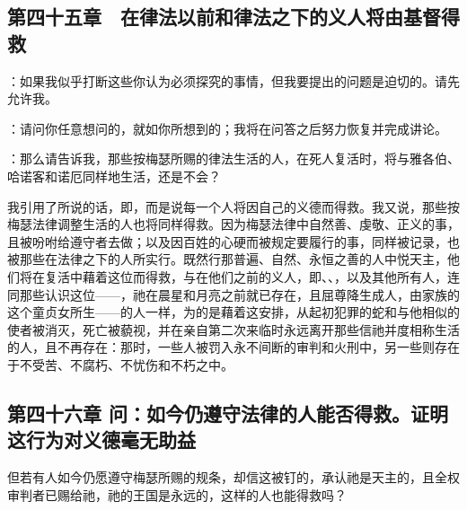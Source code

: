 
\subsection{第四十五章　在律法以前和律法之下的义人将由基督得救}

：如果我似乎打断这些你认为必须探究的事情，但我要提出的问题是迫切的。请先允许我。\par

：请问你任意想问的，就如你所想到的；我将在问答之后努力恢复并完成讲论。\par

：那么请告诉我，那些按梅瑟所赐的律法生活的人，在死人复活时，将与雅各伯、哈诺客和诺厄同样地生活，还是不会？\par

我引用了所说的话，即，而是说每一个人将因自己的义德而得救。我又说，那些按梅瑟法律调整生活的人也将同样得救。因为梅瑟法律中自然善、虔敬、正义的事，且被吩咐给遵守者去做；以及因百姓的心硬而被规定要履行的事，同样被记录，也被那些在法律之下的人所实行。既然行那普遍、自然、永恒之善的人中悦天主，他们将在复活中藉着这位而得救，与在他们之前的义人，即、、，以及其他所有人，连同那些认识这位——，祂在晨星和月亮之前就已存在，且屈尊降生成人，由家族的这个童贞女所生——的人一样，为的是藉着这安排，从起初犯罪的蛇和与他相似的使者被消灭，死亡被藐视，并在亲自第二次来临时永远离开那些信祂并度相称生活的人，且不再存在：那时，一些人被罚入永不间断的审判和火刑中，另一些则存在于不受苦、不腐朽、不忧伤和不朽之中。\par


\subsection{第四十六章 问：如今仍遵守法律的人能否得救。证明这行为对义德毫无助益}

但若有人如今仍愿遵守梅瑟所赐的规条，却信这被钉的，承认祂是天主的，且全权审判者已赐给祂，祂的王国是永远的，这样的人也能得救吗？\par

